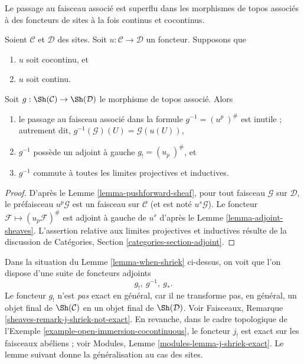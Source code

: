 \begin{lemma}
\label{lemma-when-shriek}
\begin{slogan}
Le passage au faisceau associé est superflu dans les morphismes de topos
associés à des foncteurs de sites à la fois continus et cocontinus.
\end{slogan}
Soient $\mathcal{C}$ et $\mathcal{D}$ des sites.
Soit $u : \mathcal{C} \to \mathcal{D}$ un foncteur.
Supposons que
\begin{enumerate}
\item[(a)] $u$ soit cocontinu, et
\item[(b)] $u$ soit continu.
\end{enumerate}
Soit $g : \Sh(\mathcal{C}) \to \Sh(\mathcal{D})$
le morphisme de topos associé. Alors
\begin{enumerate}
\item le passage au faisceau associé dans la formule
$g^{-1} = (u^p\ )^\#$ est inutile ; autrement dit,
$g^{-1}(\mathcal{G})(U) = \mathcal{G}(u(U))$,
\item $g^{-1}$ possède un adjoint à gauche $g_{!} = (u_p\ )^\#$, et
\item $g^{-1}$ commute à toutes les limites projectives et inductives.
\end{enumerate}
\end{lemma}

\begin{proof}
D’après le Lemme \ref{lemma-pushforward-sheaf}, pour tout faisceau
$\mathcal{G}$ sur $\mathcal{D}$, le préfaisceau $u^p\mathcal{G}$ est un
faisceau sur $\mathcal{C}$ (et est noté $u^s\mathcal{G}$). Le foncteur
$\mathcal{F} \mapsto (u_p\mathcal{F})^\#$ est adjoint à gauche de $u^s$
d’après le Lemme \ref{lemma-adjoint-sheaves}. L’assertion relative aux limites
projectives et inductives résulte de la discussion de Catégories,
Section \ref{categories-section-adjoint}.
\end{proof}

\noindent
Dans la situation du Lemme \ref{lemma-when-shriek} ci-dessus, on voit que
l’on dispose d’une suite de foncteurs adjoints
$$
g_{!}, \ g^{-1}, \ g_*.
$$
Le foncteur $g_!$ n’est {\it pas} exact en général, car il ne transforme pas,
en général, un objet final de $\Sh(\mathcal{C})$ en un objet final de
$\Sh(\mathcal{D})$.
Voir Faisceaux, Remarque \ref{sheaves-remark-j-shriek-not-exact}.
En revanche, dans le cadre topologique de
l’Exemple \ref{example-open-immersion-cocontinuous}, le foncteur $j_!$ est
exact sur les faisceaux abéliens ; voir Modules,
Lemme \ref{modules-lemma-j-shriek-exact}. Le lemme suivant donne la
généralisation au cas des sites.

